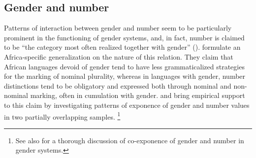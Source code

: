 \documentclass[output=collectionpaper]{langsci/langscibook}
\begin{document}
  \subsection{Gender and number}
  \label{sec:WDG:8.1}

Patterns of interaction between gender and number seem to be particularly prominent in the functioning of gender systems, and, in fact, number is claimed to be ``the category most often realized together with gender'' (\citealt[189]{Corbett1991}). \cite{Creissels2008} formulate an Africa-specific generalization on the nature of this relation. They claim that African languages devoid of gender tend to have less grammaticalized strategies for the marking of nominal plurality, whereas in languages with gender, number distinctions tend to be obligatory and expressed both through nominal and non-nominal marking, often in cumulation with gender. \cite{DiGarbo2014} and \cite{DiGarbo2018a} bring empirical support to this claim by investigating patterns of exponence of gender and number values in two partially overlapping samples.%
\footnote{%
See also  for a thorough discussion of co-exponence of gender and number in  gender systems.
} %
\end{document}
